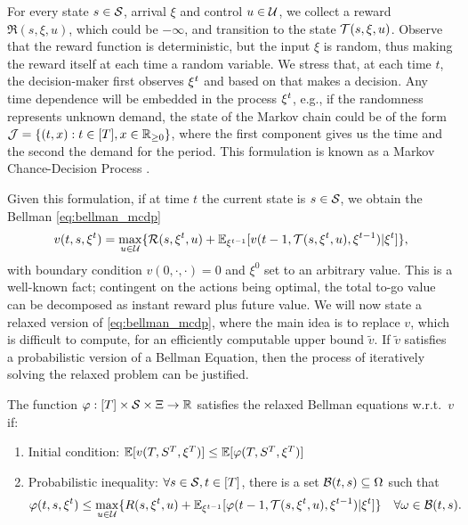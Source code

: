 \documentclass[letterpaper,11pt]{article}
\begin{document}
For every state $s\in\S$, arrival $\xi$ and control $u\in\U$, we  collect a reward $\Re(s,\xi,u)$, which could be $-\infty$, and transition to the state $\Tr(s,\xi,u)$.
Observe that the reward function is deterministic, but the input $\xi$ is random, thus making the reward itself at each time a random variable.
We stress that, at each time $t$, the decision-maker first observes $\xit$ and based on that makes a decision.
Any time dependence will be embedded in the process $\xit$, e.g., if the randomness represents unknown demand, the state of the Markov chain could be of the form $\J=\crl{(t,x):t\in[\T],x\in\Rp}$, where the first component gives us the time and the second the demand for the period.
This formulation is known as a Markov Chance-Decision Process \cite[chap 13]{online_book}.

Given this formulation, if at time $t$ the current state is $s\in\S$, we obtain the Bellman \cref{eq:bellman_mcdp}
\begin{equation}\label{eq:bellman_mcdp}
v(t,s,\xit) = \max_{u\in\U}\crl{\Re(s,\xit,u) +\E_{\xi^{t-1}}[v(t-1,\Tr(s,\xit,u),\xi^{t-1})|\xit]},
\end{equation}
with boundary condition $v(0,\cdot,\cdot)=0$ and $\xi^0$ set to an arbitrary value.
This is a well-known fact; contingent on the actions being optimal, the total to-go value can be decomposed as instant reward plus future value.
We will now state a relaxed version of \cref{eq:bellman_mcdp}, where the main idea is to replace $v$, which is difficult to compute, for an efficiently computable upper bound $\tilde v$.
If $\tilde v$ satisfies a probabilistic version of a Bellman Equation, then the process of iteratively solving the relaxed problem can be justified.

\begin{definition}
The function $\varphi:[T]\times\S\times\Xi\to \R$ satisfies the relaxed Bellman equations w.r.t.\ $v$ if:
\begin{enumerate}
\item Initial condition: $\E[v(\T,S^\T,\xi^\T)] \leq \E[\varphi(\T,S^\T,\xi^\T)]$
\item Probabilistic inequality: $\forall s\in\S,t\in[T]$, there is a set $\calB(t,s)\subseteq\Omega$ such that
\begin{equation}\label{eq:relaxed_bellman}
\varphi(t,s,\xit) \leq \max_{u\in\U}\crl{R(s,\xit,u)+\E_{\xi^{t-1}}[\varphi(t-1,\Tr(s,\xit,u),\xi^{t-1})|\xit]} \quad \forall \omega\in\calB(t,s).
\end{equation}
\end{enumerate}
\end{definition} 
 
\end{document}

